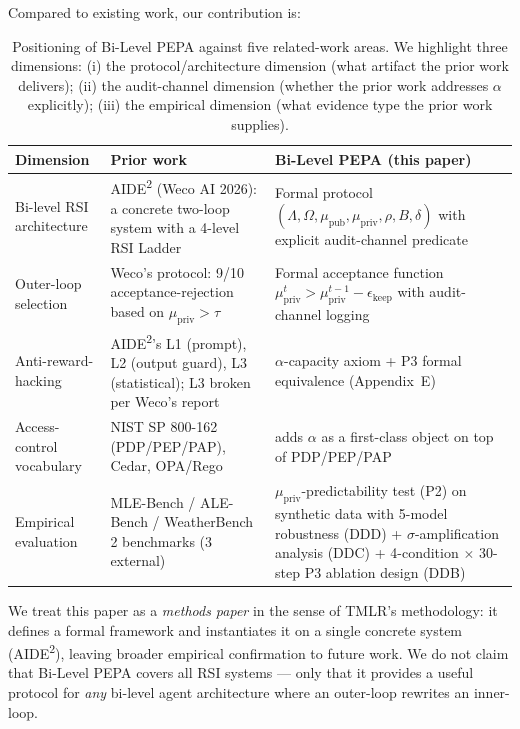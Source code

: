 Compared to existing work, our contribution is:

\begin{table}[h]
\centering
\caption{Positioning of Bi-Level PEPA against five related-work areas. We highlight three dimensions: (i) the protocol/architecture dimension (what artifact the prior work delivers); (ii) the audit-channel dimension (whether the prior work addresses $\alpha$ explicitly); (iii) the empirical dimension (what evidence type the prior work supplies).}
\label{tab:positioning}
\begin{tabular}{p{} p{} p{}}
\toprule
\textbf{Dimension} & \textbf{Prior work} & \textbf{Bi-Level PEPA (this paper)} \\
\midrule
Bi-level RSI architecture & AIDE\textsuperscript{2} (Weco AI 2026): a concrete two-loop system with a 4-level RSI Ladder & Formal protocol $(\Lambda, \Omega, \mu_{\text{pub}}, \mu_{\text{priv}}, \rho, B, \delta)$ with explicit audit-channel predicate \\
Outer-loop selection & Weco's protocol: 9/10 acceptance-rejection based on $\mu_{\text{priv}} > \tau$ & Formal acceptance function $\mu_{\text{priv}}^t > \mu_{\text{priv}}^{t-1} - \epsilon_{\text{keep}}$ with audit-channel logging \\
Anti-reward-hacking & AIDE\textsuperscript{2}'s L1 (prompt), L2 (output guard), L3 (statistical); L3 broken per Weco's report & $\alpha$-capacity axiom + P3 formal equivalence (Appendix~E) \\
Access-control vocabulary & NIST SP 800-162 (PDP/PEP/PAP), Cedar, OPA/Rego & adds $\alpha$ as a first-class object on top of PDP/PEP/PAP \\
Empirical evaluation & MLE-Bench / ALE-Bench / WeatherBench 2 benchmarks (3 external) & $\mu_{\text{priv}}$-predictability test (P2) on synthetic data with 5-model robustness (DDD) + $\sigma$-amplification analysis (DDC) + 4-condition $\times$ 30-step P3 ablation design (DDB) \\
\bottomrule
\end{tabular}
\end{table}

We treat this paper as a \emph{methods paper} in the sense of TMLR's methodology: it defines a formal framework and instantiates it on a single concrete system (AIDE\textsuperscript{2}), leaving broader empirical confirmation to future work. We do not claim that Bi-Level PEPA covers all RSI systems --- only that it provides a useful protocol for \emph{any} bi-level agent architecture where an outer-loop rewrites an inner-loop.
